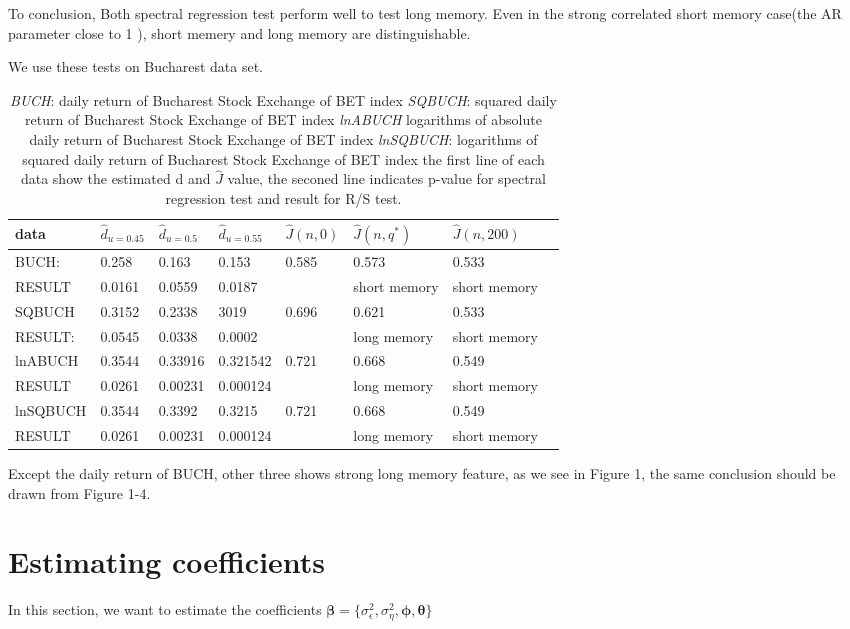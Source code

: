 \documentclass[10pt,a4paper]{article}
\begin{document}
To conclusion, Both spectral regression test perform well to test long memory. Even in the strong correlated short memory case(the AR parameter close to 1 ), short memery and long memory are distinguishable.

We use these tests on Bucharest data set. 

\begin{table}[!hbp]
\begin{tabular}{llllllll}
\hline
\hline
data & $\hat{d}_{u=0.45}$ & $\hat{d}_{u=0.5}$ & $\hat{d}_{u=0.55}$ & $\hat{J}(n,0) $& $\hat{J}(n,q^*) $&$\hat{J}(n,200)$ \\
\hline
BUCH: & 0.258 & 0.163 &  0.153 & 0.585 &     0.573 & 0.533 \\
RESULT& 0.0161 & 0.0559  & 0.0187 & \, &   short memory &  short memory\\
\hline
SQBUCH  & 0.3152 & 0.2338   & 3019 & 0.696  &   0.621 & 0.533\\
RESULT: & 0.0545 &0.0338  & 0.0002  & \, &   long memory & short memory \\
\hline
lnABUCH& 0.3544 & 0.33916  & 0.321542 & 0.721 &   0.668 & 0.549\\
RESULT & 0.0261 &  0.00231  & 0.000124 & \,  &  long memory & short memory\\
\hline
lnSQBUCH &0.3544 & 0.3392 &  0.3215 & 0.721 &     0.668 & 0.549 \\
RESULT& 0.0261  & 0.00231  & 0.000124  & \,  &   long memory &  short memory\\
\hline
\end{tabular}
\caption{\emph{BUCH}: daily return of Bucharest Stock Exchange of BET index\qquad
\emph{SQBUCH}: squared daily return of Bucharest Stock Exchange of BET index \qquad \emph{lnABUCH} logarithms of absolute daily return of Bucharest Stock Exchange of BET index \qquad \emph{lnSQBUCH}: logarithms of squared daily return of Bucharest Stock Exchange of BET index \qquad\qquad the first line of each data show the estimated d and $\hat{J}$ value, the seconed line indicates p-value for spectral regression test and result for R/S test.
}

\end{table}
Except the daily return of BUCH, other three shows strong long memory feature, as we see in Figure 1, the same conclusion should be drawn from Figure 1-4.
 
\section{Estimating coefficients}
In this section, we want to estimate the coefficients $\bm{\beta}=\{\sigma_\epsilon^2,\sigma_\eta^2,\bm{\phi,\bm{\theta}}\}$
\end{document}
